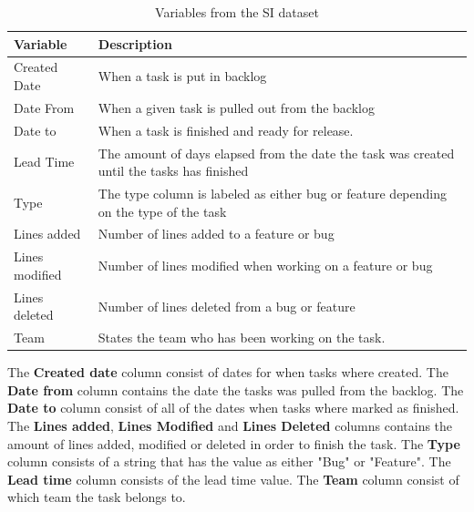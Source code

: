 \documentclass[UKenglish]{ifimaster}  %
\begin{document}
\begin{table}[!ht]
\begin{center}
    \begin{tabular}{| l | p{5cm} |}
    \hline
     \bf{Variable} & \bf{Description}\\ \hline
     Created Date & When a task is put in backlog \\ \hline
     Date From & When a given task is pulled out from the backlog\\ \hline
     Date to & When a task is finished and ready for release. \\ \hline
    Lead Time & The amount of days elapsed from the date the task was created until the tasks has finished  \\ \hline
   Type & The type column is labeled as either bug or feature depending on the type of the task \\ \hline
   Lines added & Number of lines added to a feature or bug \\ \hline
   Lines modified & Number of lines modified when working on a feature or bug \\ \hline
   Lines deleted & Number of lines deleted from a bug or feature \\
    \hline
    Team &States the team who has been working on the task.\\ \hline
    \end{tabular}
\caption{Variables from the SI dataset}
\label{IC} %
\end{center}
\end{table}

\newpage
The \textbf{Created date} column consist of dates for when tasks where created. 
The \textbf{Date from} column contains the date the tasks was pulled from the backlog. 
The \textbf{Date to} column consist of all of the dates when tasks where marked as finished.
The \textbf{Lines added}, \textbf{Lines Modified} and \textbf{Lines Deleted} columns contains the amount of lines added, modified or deleted in order to finish the task.
The \textbf{Type} column consists of a string that has the value as either "Bug" or "Feature".
The \textbf{Lead time} column consists of the lead time value. 
The \textbf{Team} column consist of which team the task belongs to. 
\end{document}
